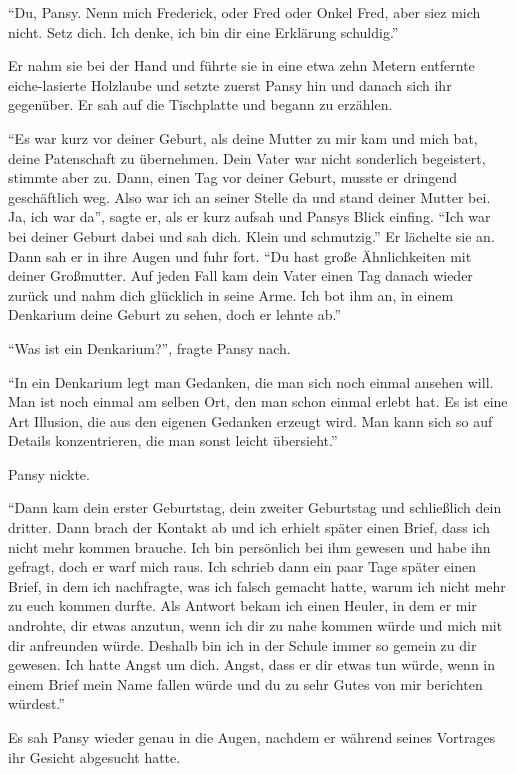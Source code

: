 \enquote{Du, Pansy. Nenn mich Frederick, oder Fred oder Onkel Fred, aber siez mich nicht. Setz dich. Ich denke, ich bin dir eine Erklärung schuldig.}

Er nahm sie bei der Hand und führte sie in eine etwa zehn Metern entfernte eiche-lasierte Holzlaube und setzte zuerst Pansy hin und danach sich ihr gegenüber. Er sah auf die Tischplatte und begann zu erzählen.

\enquote{Es war kurz vor deiner Geburt, als deine Mutter zu mir kam und mich bat, deine Patenschaft zu übernehmen. Dein Vater war nicht sonderlich begeistert, stimmte aber zu. Dann, einen Tag vor deiner Geburt, musste er dringend geschäftlich weg. Also war ich an seiner Stelle da und stand deiner Mutter bei. Ja, ich war da}, sagte er, als er kurz aufsah und Pansys Blick einfing. \enquote{Ich war bei deiner Geburt dabei und sah dich. Klein und schmutzig.} Er lächelte sie an. Dann sah er in ihre Augen und fuhr fort. \enquote{Du hast große Ähnlichkeiten mit deiner Großmutter. Auf jeden Fall kam dein Vater einen Tag danach wieder zurück und nahm dich glücklich in seine Arme. Ich bot ihm an, in einem Denkarium deine Geburt zu sehen, doch er lehnte ab.}

\enquote{Was ist ein Denkarium?}, fragte Pansy nach.

\enquote{In ein Denkarium legt man Gedanken, die man sich noch einmal ansehen will. Man ist noch einmal am selben Ort, den man schon einmal erlebt hat. Es ist eine Art Illusion, die aus den eigenen Gedanken erzeugt wird. Man kann sich so auf Details konzentrieren, die man sonst leicht übersieht.}

Pansy nickte.

\enquote{Dann kam dein erster Geburtstag, dein zweiter Geburtstag und schließlich dein dritter. Dann brach der Kontakt ab und ich erhielt später einen Brief, dass ich nicht mehr kommen brauche. Ich bin persönlich bei ihm gewesen und habe ihn gefragt, doch er warf mich raus. \gst Ich schrieb dann ein paar Tage später einen Brief, in dem ich nachfragte, was ich falsch gemacht hatte, warum ich nicht mehr zu euch kommen durfte. \gst Als Antwort bekam ich einen Heuler, in dem er mir androhte, dir etwas anzutun, wenn ich dir zu nahe kommen würde und mich mit dir anfreunden würde. \gst Deshalb bin ich in der Schule immer so gemein zu dir gewesen. Ich hatte Angst um dich. Angst, dass er dir etwas tun würde, wenn in einem Brief mein Name fallen würde und du zu sehr Gutes von mir berichten würdest.}

Es sah Pansy wieder genau in die Augen, nachdem er während seines Vortrages ihr Gesicht abgesucht hatte.

